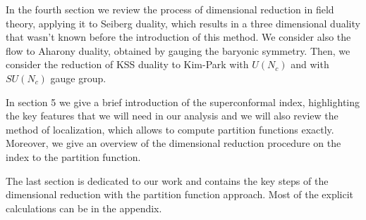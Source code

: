 In the fourth section we review the process of dimensional reduction in field theory, applying it to Seiberg duality, which results in a three dimensional duality that wasn't known before the introduction of this method. 
We  consider also the flow to Aharony duality, obtained by gauging the baryonic symmetry.
Then, we consider the reduction of KSS duality to Kim-Park with $U(N_c)$ and with $SU(N_c)$ gauge group.

In section 5 we give a brief introduction of the superconformal index, highlighting the key features that we will need in our analysis and we will also review the method of localization, which allows to compute partition functions exactly.
Moreover, we give an overview of the dimensional reduction procedure on the index to the partition function.

The last section is dedicated to our work and contains the key steps of the dimensional reduction with the partition function approach. 
Most of the explicit calculations can be in the appendix.




